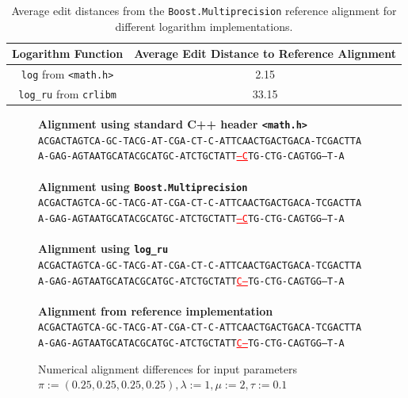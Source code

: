 \documentclass[runningheads,a4paper]{llncs}
\begin{document}
\begin{table}[h!]

\centering

\begin{tabular}{|c|c|}
\hline 
Logarithm Function & Average Edit Distance to Reference Alignment\\ 
\hline 
\texttt{log} from \texttt{<math.h>} & 2.15 \\ 
\hline 
\texttt{log\_ru} from \texttt{crlibm} & 33.15 \\ 
\hline 
\end{tabular} 
\caption{Average edit distances from the \texttt{Boost.Multiprecision} reference alignment for different logarithm implementations.}
\label{fig:dist}
\end{table}


\begin{figure}

\textbf{Alignment using standard C++ header \texttt{<math.h>}}
~
\\
\texttt{ACGACTAGTCA-GC-TACG-AT-CGA-CT-C-ATTCAACTGACTGACA-TCGACTTA} \\
\texttt{A-GAG-AGTAATGCATACGCATGC-ATCTGCTATT\textcolor{red}{\underline{---C}}TG-CTG-CAGTGG--T-A}
\\~\\
\textbf{Alignment using \texttt{Boost.Multiprecision}}
~
\\
\texttt{ACGACTAGTCA-GC-TACG-AT-CGA-CT-C-ATTCAACTGACTGACA-TCGACTTA} \\
\texttt{A-GAG-AGTAATGCATACGCATGC-ATCTGCTATT\textcolor{red}{\underline{---C}}TG-CTG-CAGTGG--T-A}
\\~\\
\textbf{Alignment using \texttt{log\_ru}}
~
\\
\texttt{ACGACTAGTCA-GC-TACG-AT-CGA-CT-C-ATTCAACTGACTGACA-TCGACTTA} \\
\texttt{A-GAG-AGTAATGCATACGCATGC-ATCTGCTATT\textcolor{red}{\underline{C---}}TG-CTG-CAGTGG--T-A}
\\~\\
\textbf{Alignment from reference implementation}
~
\\
\texttt{ACGACTAGTCA-GC-TACG-AT-CGA-CT-C-ATTCAACTGACTGACA-TCGACTTA} \\
\texttt{A-GAG-AGTAATGCATACGCATGC-ATCTGCTATT\textcolor{red}{\underline{C---}}TG-CTG-CAGTGG--T-A}

\caption{Numerical alignment differences for input parameters $\pi:=(0.25,0.25,0.25,0.25), \lambda:=1, \mu:= 2, \tau := 0.1$}
\label{fig:alignments}
\end{figure}
\end{document}
